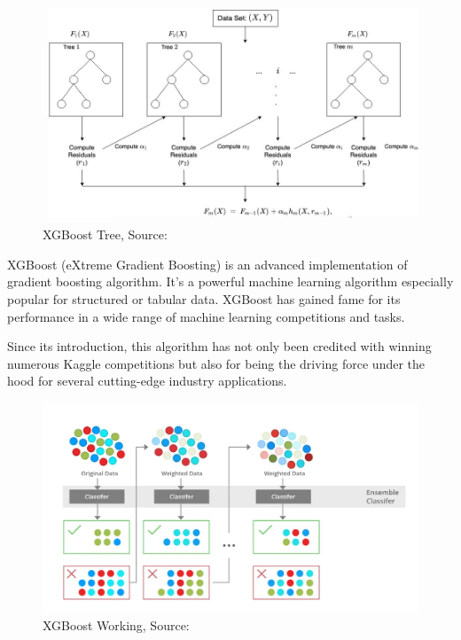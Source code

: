         \begin{figure}
            \centering
            \includegraphics[width=1\linewidth]{graphics//chapter3/xgboost-tree.png}
            \caption{XGBoost Tree, Source: \cite{WEBSITE:xgb-credit-0}}
            \label{fig:xgboost-tree}
        \end{figure}
        
        XGBoost (eXtreme Gradient Boosting) is an advanced implementation of gradient boosting algorithm. It’s a powerful machine learning algorithm especially popular for structured or tabular data. XGBoost has gained fame for its performance in a wide range of machine learning competitions and tasks\cite{xgb}.\par\vspace{1em}
        Since its introduction, this algorithm has not only been credited with winning numerous Kaggle competitions but also for being the driving force under the hood for several cutting-edge industry applications. \par\vspace{1em}
        
        \begin{figure}
            \centering
            \includegraphics[width=\linewidth]{graphics//chapter3/xgboost1.png}
            \caption{XGBoost Working, Source:\cite{WEBSITE:xgb-credit-1}}
            \label{fig:xgboost-1}
        \end{figure}        

